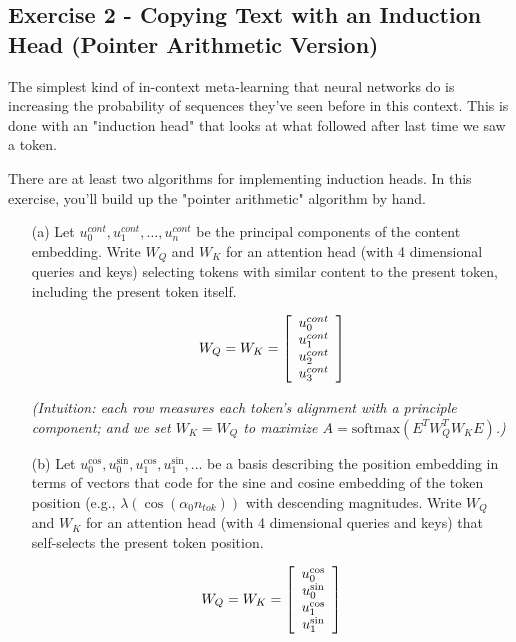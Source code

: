 \documentclass[11pt]{article}
\newenvironment{answerbox}%
  {\begin{mdframed}[linecolor=darkgray,%
                    roundcorner=10pt,innertopmargin=10pt,%
                    innerbottommargin=10pt,skipabove=12pt,skipbelow=12pt]}%
  {\end{mdframed}}
\begin{document}
\subsection*{Exercise 2 - Copying Text with an Induction Head (Pointer Arithmetic Version)}

The simplest kind of in-context meta-learning that neural networks do is increasing the probability of sequences they've seen before in this context. This is done with an "induction head" that looks at what followed after last time we saw a token.


There are at least two algorithms for implementing induction heads. In this exercise, you'll build up the "pointer arithmetic" algorithm by hand.

\begin{itemize}
    \item[(a)] Let $u_0^{cont}, u_1^{cont}, \ldots, u_n^{cont}$ be the principal components of the content embedding. Write $W_Q$ and $W_K$ for an attention head (with 4 dimensional queries and keys) selecting tokens with similar content to the present token, including the present token itself.

\begin{answerbox}
$$
W_Q = W_K = \left[
\begin{array}{*{1}c}
u^{cont}_0 \\
u^{cont}_1 \\
u^{cont}_2 \\
u^{cont}_3 \\
\end{array}
\right]
$$

\textit{(Intuition: each row measures each token's alignment with a principle component; and we set $W_K=W_Q$ to maximize $A = \mathrm{softmax}(E^TW_Q^TW_KE)$.)}
\end{answerbox}
    
    \item[(b)] Let $u_0^{\cos}, u_0^{\sin}, u_1^{\cos}, u_1^{\sin}, \ldots$ be a basis describing the position embedding in terms of vectors that code for the sine and cosine embedding of the token position (e.g., $\lambda(\cos(\alpha_0 n_{tok}))$ with descending magnitudes. Write $W_Q$ and $W_K$ for an attention head (with 4 dimensional queries and keys) that self-selects the present token position.

\begin{answerbox}
    $$
W_Q = W_K = \left[
\begin{array}{*{1}c}
u^{\cos}_0 \\
u^{\sin}_0 \\
u^{\cos}_1 \\
u^{\sin}_1 \\
\end{array}
\right]
$$


\end{answerbox}
\end{itemize}
\end{document}
